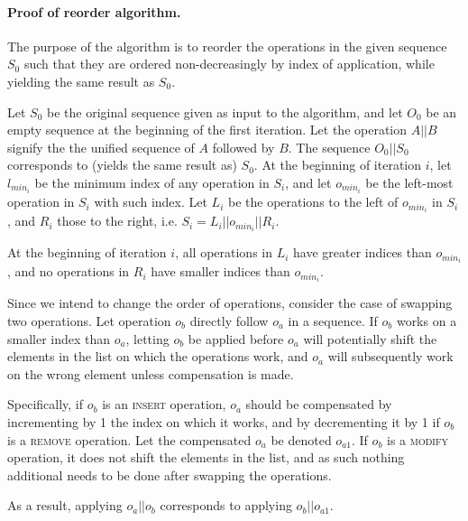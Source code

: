\paragraph {Proof of reorder algorithm.}
The purpose of the algorithm is to reorder the operations in the given sequence
$S_0$ such that they are ordered non-decreasingly by index of application, while
yielding the same result as $S_0$.
\begin{definition}
\label{def:reorder-iter}

Let $S_0$ be the original sequence given as input to the algorithm, and let
$O_0$ be an empty sequence at the beginning of the first iteration. Let the
operation $A || B$ signify the the unified sequence of $A$ followed by $B$. The
sequence $O_0 || S_0$ corresponds to (yields the same result as) $S_0$. At the
beginning of iteration $i$, let $l_{min_i}$ be the minimum index of any
operation in $S_i$, and let $o_{min_i}$ be the left-most operation in $S_i$ with
such index. Let $L_i$ be the operations to the left of $o_{min_i}$ in $S_i$, and
$R_i$ those to the right, i.e. $S_i = L_i || o_{min_i} || R_i$.

\end{definition}

\begin{lemma}
\label{lem:reorder-inequality}

At the beginning of iteration $i$, all operations in $L_i$ have greater indices
than $o_{min_i}$, and no operations in $R_i$ have smaller indices than
$o_{min_i}$.

\end{lemma}

Since we intend to change the order of operations, consider the case of swapping
two operations. Let operation $o_b$ directly follow $o_a$ in a sequence. If
$o_b$ works on a smaller index than $o_a$, letting $o_b$ be applied before $o_a$
will potentially shift the elements in the list on which the operations work,
and $o_a$ will subsequently work on the wrong element unless compensation is
made.

Specifically, if $o_b$ is an \textsc{insert} operation, $o_a$ should be
compensated by incrementing by 1 the index on which it works, and by
decrementing it by 1 if $o_b$ is a \textsc{remove} operation. Let the
compensated $o_a$ be denoted $o_{a1}$. If $o_b$ is a \textsc{modify} operation,
it does not shift the elements in the list, and as such nothing additional needs
to be done after swapping the operations.

As a result, applying $o_a || o_b$ corresponds to applying $o_b || o_{a1}$.

